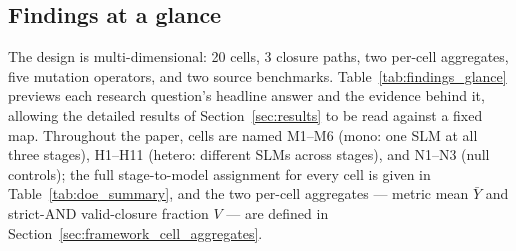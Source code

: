 \subsection{Findings at a glance}

The design is multi-dimensional: 20 cells, 3 closure paths, two per-cell aggregates, five mutation operators, and two source benchmarks. Table~\ref{tab:findings_glance} previews each research question's headline answer and the evidence behind it, allowing the detailed results of Section~\ref{sec:results} to be read against a fixed map. Throughout the paper, cells are named M1--M6 (mono: one SLM at all three stages), H1--H11 (hetero: different SLMs across stages), and N1--N3 (null controls); the full stage-to-model assignment for every cell is given in Table~\ref{tab:doe_summary}, and the two per-cell aggregates --- metric mean $\bar{Y}$ and strict-AND valid-closure fraction $V$ --- are defined in Section~\ref{sec:framework_cell_aggregates}.

